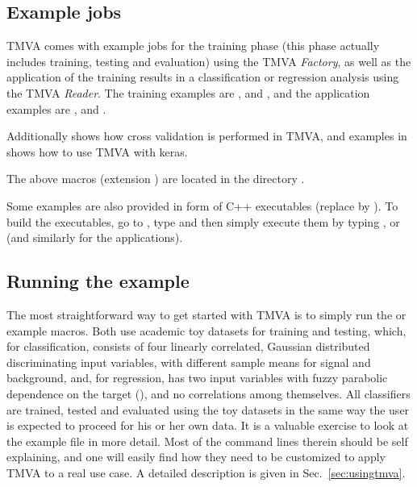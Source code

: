 \subsection{Example jobs}
\label{sec:examplejob}

TMVA comes with example jobs for the training phase (this phase actually
includes training, testing and evaluation) using the TMVA {\em Factory},
as well as the application of the training results in a classification or regression analysis
using the TMVA {\em Reader}. The training examples are
,
 and
, and the application examples are
,
 and
.

Additionally  shows how cross validation is performed in TMVA, and examples in \TmvaKerasTutorialDir shows how to use TMVA with keras.

The above macros (extension ) are located in the directory \TmvaTutorialDir.

Some examples are also provided in form of C++ executables
(replace  by ). To build the executables, go to
\TmvaTutorialDir, type  and then simply execute them by typing
,  or  (and similarly for the
applications).


\subsection{Running the example}
\label{sec:qs:example}

The most straightforward way to get started with TMVA is to simply run the 
or  example macros. Both use academic toy datasets for training
and testing, which, for classification, consists of four linearly correlated, Gaussian
distributed discriminating input variables, with different sample means for signal and
background, and, for regression, has two input variables with fuzzy parabolic dependence
on the target (), and no correlations among themselves. All
classifiers are trained, tested and evaluated using the toy datasets in the
same way the user is expected to proceed for his or her own data. It
is a valuable exercise to look at the example file in more detail. Most
of the command lines therein should be self explaining, and one will easily
find how they need to be customized to apply TMVA to a real use case.
A detailed description is given in Sec.~\ref{sec:usingtmva}.

